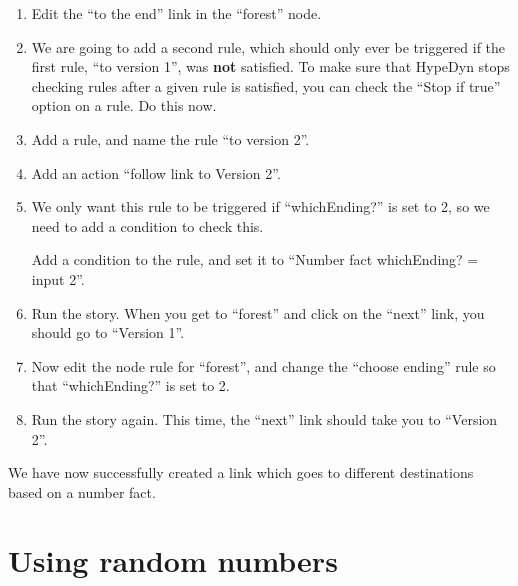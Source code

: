 \documentclass{article}
\begin{document}
\begin{enumerate}
    \item Edit the ``to the end'' link in the ``forest'' node.
    \item We are going to add a second rule, which should only ever 
    be triggered if the first rule, ``to version 1'', was 
    \textbf{not} satisfied. To make sure that HypeDyn stops checking 
    rules after a given rule is satisfied, you can check the ``Stop 
    if true'' option on a rule. Do this now.
    \item Add a rule, and name the rule ``to version 2''.
    \item Add an action ``follow link to Version 2''.
    \item We only want this rule to be triggered if ``whichEnding?'' 
    is set to 2, so we need to add a condition to check this. 

    
    Add a condition to the rule, and set it to ``Number fact 
    whichEnding? = input 2''.
    \item Run the story. When you get to ``forest'' and click on the 
    ``next'' link, you should go to ``Version 1''.
    \item Now edit the node rule for ``forest'', and change the 
    ``choose ending'' rule so that ``whichEnding?'' is set to 2.
    \item Run the story again. This time, the ``next'' link should 
    take you to ``Version 2''.
\end{enumerate}

\noindent We have now successfully created a link which goes to different 
destinations based on a number fact.



\section{Using random numbers}
\end{document}
